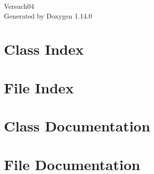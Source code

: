 \documentclass[twoside]{book}
\newcommand{\+}{\discretionary{\mbox{\scriptsize$\hookleftarrow$}}{}{}}
\newcommand{\clearemptydoublepage}{%
    \newpage{\pagestyle{empty}\cleardoublepage}%
  }
\begin{document}
  \raggedbottom
    \hypersetup{pageanchor=false,
                bookmarksnumbered=true,
                pdfencoding=unicode
               }
  \begin{titlepage}
  \vspace*{7cm}
  \begin{center}%
  {\Large Versuch04}\\
  \vspace*{1cm}
  {\large Generated by Doxygen 1.14.0}\\
  \end{center}
  \end{titlepage}
  \clearemptydoublepage
  \tableofcontents
  \clearemptydoublepage
  \hypersetup{pageanchor=true}
\chapter{Class Index}

\chapter{File Index}

\chapter{Class Documentation}

\chapter{File Documentation}

  \backmatter
  \newpage
  \clearemptydoublepage
  \printindex
\end{document}
